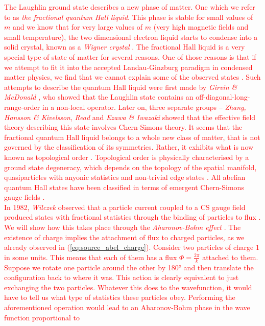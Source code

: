  \textcolor{red}{The Laughlin ground state describes a new phase of matter. One which we refer to as \textit{the fractional quantum Hall liquid}. This phase is stable for small values of $m$ and we know that for very large values of $m$ (very high magnetic fields and small temperature), the two dimensional electron liquid starts to condense into a solid crystal, known as a \textit{Wigner crystal} \cite{PhysRevLett.60.2765, PhysRev.46.1002, Wigner1938}. The fractional Hall liquid is a very special type of state of matter for several reasons. One of those reasons is that if we attempt to fit it into the accepted Landau-Ginzburg paradigm in condensed matter physics, we find that we cannot explain some of the observed states \cite{wen2004quantum}. Such attempts to describe the quantum Hall liquid were first made by \textit{Girvin \& McDonald} \cite{PhysRevLett.58.1252}, who showed that the Laughlin state contains an off-diagonal-long-range-order in a non-local operator. Later on, three separate groups --  \textit{Zhang, Hansson \& Kivelsson}, \textit{Read} and \textit{Ezawa \& Iwazaki} \cite{PhysRevLett.62.82, PhysRevB.43.2637, Read1989} showed that the effective field theory describing this state involves Chern-Simons theory. It seems that the fractional quantum Hall liquid belongs to a whole new class of matter, that is not governed by the classification of its symmetries. Rather, it exhibits what is now known as topological order \cite{Wen:1995qn, TopOrderRigidStates}. Topological order is physically characteri\textcolor{red}{s}ed by a ground state degeneracy, which depends on the topology of the spatial manifold, quasiparticles with anyonic statistics and non-trivial edge states \cite{Wen:1995qn}. All abelian quantum Hall states have been classified in terms of emergent Chern-Simons gauge fields \cite{PhysRevB.46.2290}.}\\
\indent \textcolor{red}{In 1982, \textit{Wilczek} observed that a particle current coupled to a CS gauge field produced states with fractional statistics through the binding of particles to flux \cite{Wilczek:1981du}. We will show how this takes place through the \textit{Aharonov-Bohm effect} \cite{Aharonov:1959fk, PhysRevLett.5.3}. The existence of charge implies the attachment of flux to charged particles, as we already observed in (\ref{eq:source_abel_charge}). Consider two particles of charge $1$ in some units. This means that each of them has a flux $\Phi = \frac{2\pi}{k}$ attached to them. Suppose we rotate one particle around the other by 180° and then translate the configuration back to where it was. This action is clearly equivalent to just exchanging the two particles. Whatever this does to the wavefunction, it would have to tell us what type of statistics these particles obey. Performing the aforementioned operation would lead to an Aharonov-Bohm phase in the wave function proportional to}
